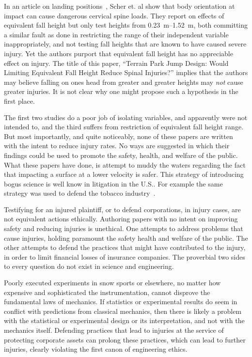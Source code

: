 \documentclass{article}
\begin{document}
In an article on landing positions~\cite{Scher2015}, Scher et. al show that
body orientation at impact can cause dangerous cervical spine loads. They
report on effects of equivalent fall height but only test heights from
\SIrange{0.23}{1.52}{\meter}, both committing a similar fault as done in
\cite{Shealy2010} restricting the range of their independent variable
inappropriately, and not testing fall heights that are known to have caused
severe injury. Yet the authors purport that equivalent fall height has no
appreciable effect on injury. The title of this paper, ``Terrain Park Jump
Design: Would Limiting Equivalent Fall Height Reduce Spinal Injuries?'' implies
that the authors may believe falling on ones head from greater and greater
heights may \emph{not} cause greater injuries. It is not clear why one might
propose such a hypothesis in the first place.

The first two studies do a poor job of isolating variables, and apparently were
not intended to, and the third suffers from restriction of equivalent fall
height range. But most importantly, and quite noticeably, none of these papers
are written with the intent to reduce injury rates. No ways are suggested in
which their findings could be used to promote the safety, health, and welfare
of the public. What these papers have done, is attempt to muddy the waters
regarding the fact that impacting a surface at a lower velocity is safer. This
strategy of introducing bogus science is well know in litigation in the U.S..
For example the same strategy was used to defend the tobacco
industry~\cite{Oreskes2010}.

Testifying for an injured plaintiff, or to defend corporations, in injury
cases, are not equivalent actions ethically. Authoring papers with no intent on
improving safety and reducing injuries is unethical. One attempts to address
problems that cause injuries, holding paramount the safety health and welfare
of the public. The other attempts to defend the practices that might have
contributed to the injury, in order to limit financial losses of insurance
companies. The proverbial two sides to every question do not exist in science
and engineering.

Poorly executed experiments in snow sports or elsewhere, no matter how
expensive and sophisticated the instrumentation, cannot disprove the
fundamental laws of  mechanics. If statistics or experimental results do seem
in conflict with predictions from classical mechanics, then there is likely a
problem with the statistical or experimental design or its interpretation, and
not with the mechanics itself. Defending practices that lead to injuries at the
service of protecting corporate assets can prolong these practices, which can
lead to further injuries, clearly violating the first canon of engineering
ethics.
\end{document}
